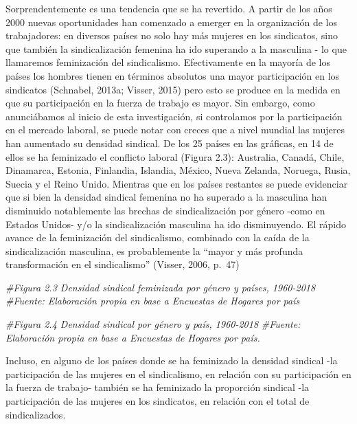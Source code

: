 \documentclass[
]{book}
\newenvironment{Shaded}{\begin{snugshade}}{\end{snugshade}}
\newcommand{\CommentTok}[1]{\textcolor[rgb]{0.56,0.35,0.01}{\textit{#1}}}
\begin{document}
Sorprendentemente es una tendencia que se ha revertido. A partir de los años 2000 nuevas oportunidades han comenzado a emerger en la organización de los trabajadores: en diversos países no solo hay más mujeres en los sindicatos, sino que también la sindicalización femenina ha ido superando a la masculina - lo que llamaremos feminización del sindicalismo. Efectivamente en la mayoría de los países los hombres tienen en términos absolutos una mayor participación en los sindicatos (Schnabel, 2013a; Visser, 2015) pero esto se produce en la medida en que su participación en la fuerza de trabajo es mayor.
Sin embargo, como anunciábamos al inicio de esta investigación, si controlamos por la participación en el mercado laboral, se puede notar con creces que a nivel mundial las mujeres han aumentado su densidad sindical. De los 25 países en las gráficas, en 14 de ellos se ha feminizado el conflicto laboral (Figura 2.3): Australia, Canadá, Chile, Dinamarca, Estonia, Finlandia, Islandia, México, Nueva Zelanda, Noruega, Rusia, Suecia y el Reino Unido. Mientras que en los países restantes se puede evidenciar que si bien la densidad sindical femenina no ha superado a la masculina han disminuido notablemente las brechas de sindicalización por género -como en Estados Unidos- y/o la sindicalización masculina ha ido disminuyendo. El rápido avance de la feminización del sindicalismo, combinado con la caída de la sindicalización masculina, es probablemente la ``mayor y más profunda transformación en el sindicalismo'' (Visser, 2006, p.~47)

\begin{Shaded}
\begin{Highlighting}[]
\CommentTok{#Figura 2.3 Densidad sindical feminizada por género y países, 1960-2018}
\CommentTok{#Fuente: Elaboración propia en base a Encuestas de Hogares por país}
\end{Highlighting}
\end{Shaded}

\begin{Shaded}
\begin{Highlighting}[]
\CommentTok{#Figura 2.4 Densidad sindical por género y país, 1960-2018}
\CommentTok{#Fuente: Elaboración propia en base a Encuestas de Hogares por país.}
\end{Highlighting}
\end{Shaded}

Incluso, en alguno de los países donde se ha feminizado la densidad sindical -la participación de las mujeres en el sindicalismo, en relación con su participación en la fuerza de trabajo- también se ha feminizado la proporción sindical -la participación de las mujeres en los sindicatos, en relación con el total de sindicalizados.
\end{document}
